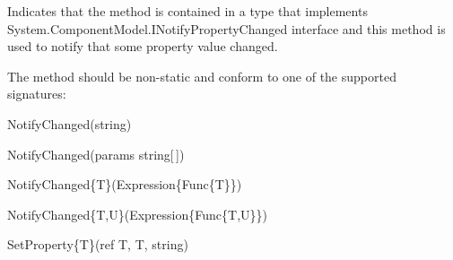 Indicates that the method is contained in a type that implements {\ttfamily System.\+Component\+Model.\+I\+Notify\+Property\+Changed} interface and this method is used to notify that some property value changed. 

The method should be non-\/static and conform to one of the supported signatures\+: 
\begin{DoxyItemize}
\item {\ttfamily Notify\+Changed(string)} 
\item {\ttfamily Notify\+Changed(params string\mbox{[}$\,$\mbox{]})} 
\item {\ttfamily Notify\+Changed\{T\}(Expression\{Func\{T\}\})} 
\item {\ttfamily Notify\+Changed\{T,U\}(Expression\{Func\{T,U\}\})} 
\item {\ttfamily Set\+Property\{T\}(ref T, T, string)} 
\end{DoxyItemize}


\begin{DoxyCode}{0}
\DoxyCodeLine{}
\DoxyCodeLine{  [NotifyPropertyChangedInvocator]}
\DoxyCodeLine{}
\DoxyCodeLine{}
\end{DoxyCode}

